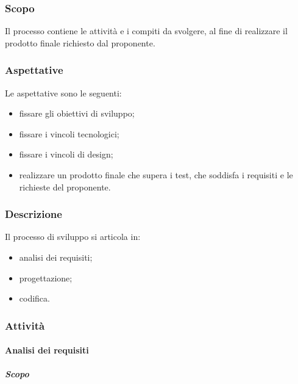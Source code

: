 \subsubsection{Scopo}
Il processo contiene le attività e i compiti da svolgere, al fine di realizzare 
il prodotto finale richiesto dal proponente.

\subsubsection{Aspettative}
Le aspettative sono le seguenti:
	\begin{itemize}
		\item fissare gli obiettivi di sviluppo;
		\item fissare i vincoli tecnologici;
		\item fissare i vincoli di design;
		\item realizzare un prodotto finale che supera i test, che soddisfa i 
			requisiti e le richieste del proponente.
	\end{itemize}
	
\subsubsection{Descrizione}
Il processo di sviluppo si articola in:
	\begin{itemize}
		\item analisi dei requisiti;
		\item progettazione;
		\item codifica.
	\end{itemize}
	
\subsubsection{Attività}
\paragraph{Analisi dei requisiti} 
\subparagraph{Scopo}  \mbox{}\\ 

